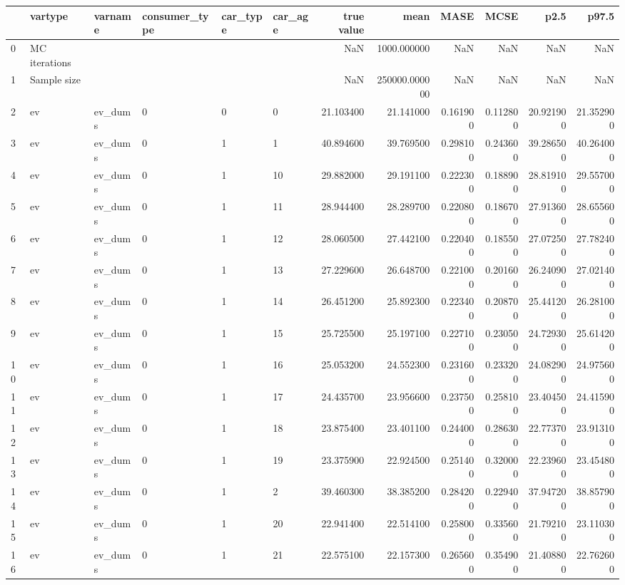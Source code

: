 \begin{tabular}{llllllrrrrrr}
\toprule
 & vartype & varname & consumer_type & car_type & car_age & true value & mean & MASE & MCSE & p2.5 & p97.5 \\
\midrule
0 & MC iterations &  &  &  &  & NaN & 1000.000000 & NaN & NaN & NaN & NaN \\
1 & Sample size &  &  &  &  & NaN & 250000.000000 & NaN & NaN & NaN & NaN \\
2 & ev & ev_dums & 0 & 0 & 0 & 21.103400 & 21.141000 & 0.161900 & 0.112800 & 20.921900 & 21.352900 \\
3 & ev & ev_dums & 0 & 1 & 1 & 40.894600 & 39.769500 & 0.298100 & 0.243600 & 39.286500 & 40.264000 \\
4 & ev & ev_dums & 0 & 1 & 10 & 29.882000 & 29.191100 & 0.222300 & 0.188900 & 28.819100 & 29.557000 \\
5 & ev & ev_dums & 0 & 1 & 11 & 28.944400 & 28.289700 & 0.220800 & 0.186700 & 27.913600 & 28.655600 \\
6 & ev & ev_dums & 0 & 1 & 12 & 28.060500 & 27.442100 & 0.220400 & 0.185500 & 27.072500 & 27.782400 \\
7 & ev & ev_dums & 0 & 1 & 13 & 27.229600 & 26.648700 & 0.221000 & 0.201600 & 26.240900 & 27.021400 \\
8 & ev & ev_dums & 0 & 1 & 14 & 26.451200 & 25.892300 & 0.223400 & 0.208700 & 25.441200 & 26.281000 \\
9 & ev & ev_dums & 0 & 1 & 15 & 25.725500 & 25.197100 & 0.227100 & 0.230500 & 24.729300 & 25.614200 \\
10 & ev & ev_dums & 0 & 1 & 16 & 25.053200 & 24.552300 & 0.231600 & 0.233200 & 24.082900 & 24.975600 \\
11 & ev & ev_dums & 0 & 1 & 17 & 24.435700 & 23.956600 & 0.237500 & 0.258100 & 23.404500 & 24.415900 \\
12 & ev & ev_dums & 0 & 1 & 18 & 23.875400 & 23.401100 & 0.244000 & 0.286300 & 22.773700 & 23.913100 \\
13 & ev & ev_dums & 0 & 1 & 19 & 23.375900 & 22.924500 & 0.251400 & 0.320000 & 22.239600 & 23.454800 \\
14 & ev & ev_dums & 0 & 1 & 2 & 39.460300 & 38.385200 & 0.284200 & 0.229400 & 37.947200 & 38.857900 \\
15 & ev & ev_dums & 0 & 1 & 20 & 22.941400 & 22.514100 & 0.258000 & 0.335600 & 21.792100 & 23.110300 \\
16 & ev & ev_dums & 0 & 1 & 21 & 22.575100 & 22.157300 & 0.265600 & 0.354900 & 21.408800 & 22.762600 \\

\end{tabular}
